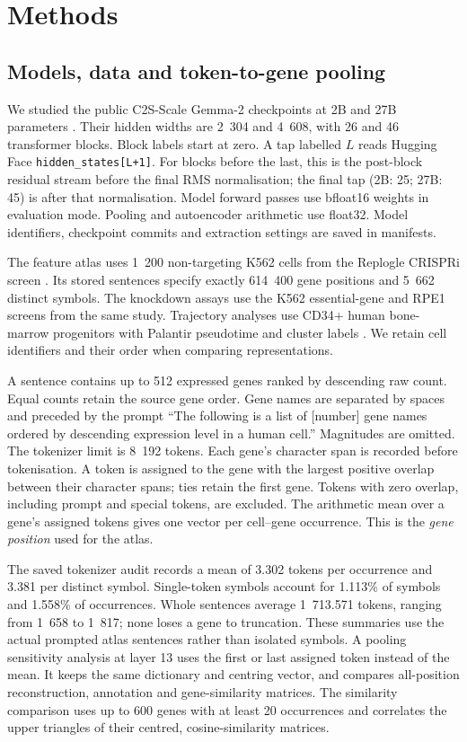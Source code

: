 \documentclass[review,authoryear,12pt]{elsarticle}
\begin{document}
\section{Methods}

\subsection{Models, data and token-to-gene pooling}

We studied the public C2S-Scale Gemma-2 checkpoints at 2B and 27B parameters
\citep{ref2,ref23}. Their hidden widths are 2~304 and 4~608, with 26 and 46 transformer blocks.
Block labels start at zero. A tap labelled $L$ reads Hugging Face
\texttt{hidden\_states[L+1]}. For blocks before the last, this is the post-block residual stream
before the final RMS normalisation; the final tap (2B: 25; 27B: 45) is after that normalisation.
Model forward passes use bfloat16 weights in evaluation mode. Pooling and autoencoder arithmetic
use float32. Model identifiers, checkpoint commits and extraction settings are saved in manifests.

The feature atlas uses 1~200 non-targeting K562 cells from the Replogle CRISPRi screen
\citep{ref24}. Its stored sentences specify exactly 614~400 gene positions and 5~662 distinct
symbols. The knockdown assays use the K562 essential-gene and RPE1 screens from the same study.
Trajectory analyses use CD34+ human bone-marrow progenitors with Palantir pseudotime and cluster
labels \citep{ref25}. We retain cell identifiers and their order when comparing representations.

A sentence contains up to 512 expressed genes ranked by descending raw count. Equal counts retain
the source gene order. Gene names are separated by spaces and preceded by the prompt
``The following is a list of [number] gene names ordered by descending expression level in a human
cell.'' Magnitudes are omitted. The tokenizer limit is 8~192 tokens. Each gene's character span is
recorded before tokenisation. A token is assigned to the gene with the largest positive overlap
between their character spans; ties retain the first gene. Tokens with zero overlap, including
prompt and special tokens, are excluded. The arithmetic mean over a gene's assigned tokens gives
one vector per cell--gene occurrence. This is the \emph{gene position} used for the atlas.

The saved tokenizer audit records a mean of 3.302 tokens per occurrence and 3.381 per distinct
symbol. Single-token symbols account for 1.113\% of symbols and 1.558\% of occurrences.
Whole sentences average 1~713.571 tokens, ranging from 1~658 to 1~817; none loses a gene to
truncation. These summaries use the actual prompted atlas sentences rather than isolated symbols.
A pooling sensitivity analysis at layer 13 uses the first or last assigned token instead of the
mean. It keeps the same dictionary and centring vector, and compares all-position reconstruction,
annotation and gene-similarity matrices. The similarity comparison uses up to 600 genes with at
least 20 occurrences and correlates the upper triangles of their centred, cosine-similarity matrices.
\end{document}
